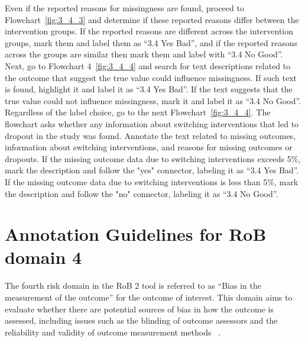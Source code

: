 \documentclass[sn-mathphys,Numbered]{sn-jnl}%
\begin{document}
Even if the reported reasons for missingness are found, proceed to Flowchart~\ref{fig:3_4_3} and determine if these reported reasons differ between the intervention groups.
If the reported reasons are different across the intervention groups, mark them and label them as ``3.4 Yes Bad'', and if the reported reasons across the groups are similar then mark them and label with ``3.4 No Good''.
Next, go to Flowchart 4~\ref{fig:3_4_4} and search for text descriptions related to the outcome that suggest the true value could influence missingness.
If such text is found, highlight it and label it as ``3.4 Yes Bad''.
If the text suggests that the true value could not influence missingness, mark it and label it as ``3.4 No Good''.
Regardless of the label choice, go to the next Flowchart~\ref{fig:3_4_4}.
The flowchart asks whether any information about switching interventions that led to dropout in the study was found.
Annotate the text related to missing outcomes, information about switching interventions, and reasons for missing outcomes or dropouts.
If the missing outcome data due to switching interventions exceeds 5\%, mark the description and follow the "yes" connector, labeling it as ``3.4 Yes Bad''.
If the missing outcome data due to switching interventions is less than 5\%, mark the description and follow the "no" connector, labeling it as ``3.4 No Good''.


%
%
%
\section*{Annotation Guidelines for RoB domain 4}
\label{sec:dom4}
%
The fourth risk domain in the RoB 2 tool is referred to as ``Bias in the measurement of the outcome'' for the outcome of interest.
This domain aims to evaluate whether there are potential sources of bias in how the outcome is assessed, including issues such as the blinding of outcome assessors and the reliability and validity of outcome measurement methods ~\cite{heneghan2017clinical,dadouch2019variation}.
%
%
%
\end{document}
